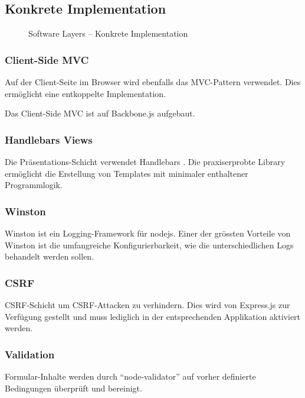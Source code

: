 \subsection*{Konkrete Implementation}

\begin{figure}[H]
	\centering{
		
	}

	\caption{Software Layers -- Konkrete Implementation}
\end{figure}

\newpage
\subsubsection*{Client-Side MVC}
Auf der Client-Seite im Browser wird ebenfalls das MVC-Pattern \cite{MVC}verwendet. Dies ermöglicht eine entkoppelte Implementation.

Das Client-Side MVC ist auf Backbone.js \cite{Backbonejs} aufgebaut.

\subsubsection*{Handlebars Views}
Die Präsentations-Schicht verwendet Handlebars \cite{Handlebars}. Die praxiserprobte Library ermöglicht die Erstellung von Templates mit minimaler enthaltener Programmlogik.

\subsubsection*{Winston}
Winston \cite{Winston} ist ein Logging-Framework für \gls{nodejs}. Einer der grössten Vorteile von Winston ist die umfangreiche Konfigurierbarkeit, wie die unterschiedlichen Logs behandelt werden sollen.

\subsubsection*{CSRF}
\gls{CSRF}-Schicht um CSRF-Attacken zu verhindern. Dies wird von Express.js zur Verfügung gestellt \cite{ExpressjsCSRF} und muss lediglich in der entsprechenden Applikation aktiviert werden.

\subsubsection*{Validation}
Formular-Inhalte werden durch ``node-validator'' \cite{nodevalidator} auf vorher definierte Bedingungen überprüft und bereinigt.

